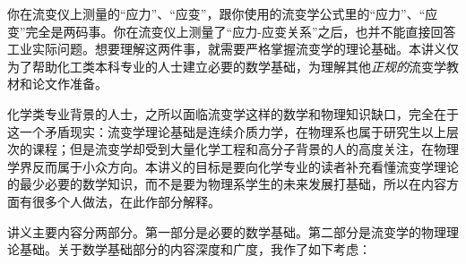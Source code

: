 \documentclass[main.tex]{subfiles}
\begin{document}
你在流变仪上测量的“应力”、“应变”，跟你使用的流变学公式里的“应力”、“应变”完全是两码事。你在流变仪上测量了“应力-应变关系”之后，也并不能直接回答工业实际问题。想要理解这两件事，就需要严格掌握流变学的理论基础。本讲义仅为了帮助化工类本科专业的人士建立必要的数学基础，为理解其他\emph{正规的}流变学教材和论文作准备。

化学类专业背景的人士，之所以面临流变学这样的数学和物理知识缺口，完全在于这一个矛盾现实：流变学理论基础是连续介质力学，在物理系也属于研究生以上层次的课程；但是流变学却受到大量化学工程和高分子背景的人的高度关注，在物理学界反而属于小众方向。本讲义的目标是要向化学专业的读者补充看懂流变学理论的最少必要的数学知识，而不是要为物理系学生的未来发展打基础，所以在内容方面有很多个人做法，在此作部分解释。

讲义主要内容分两部分。第一部分是必要的数学基础。第二部分是流变学的物理理论基础。关于数学基础部分的内容深度和广度，我作了如下考虑：
\end{document}
